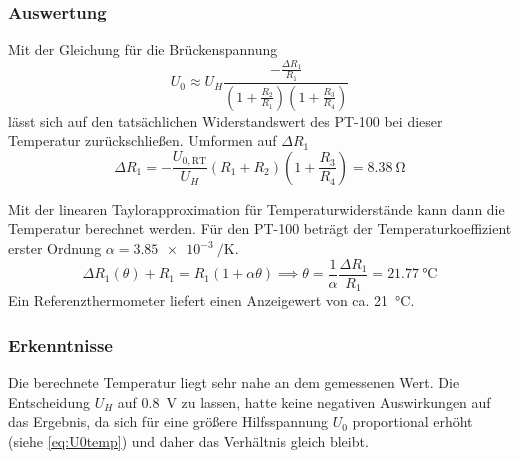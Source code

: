 \subsubsection{Auswertung}

Mit der Gleichung \cite[S.~41, Gl.~2.5]{EMTPraktikum2025} für die Brückenspannung
\begin{equation}
	U_0 \approx U_H \frac{-\frac{\Delta R_1}{R_1}}{\left(1+\frac{R_2}{R_1}\right)\left(1+\frac{R_3}{R_4}\right)}\label{eq:U0temp}
\end{equation}
lässt sich auf den tatsächlichen Widerstandswert des PT-100 bei dieser Temperatur zurückschließen. Umformen auf $\Delta R_1$
\[
	\Delta R_1 = -\frac{U_{0,\text{RT}}}{U_H}(R_1+R_2)\left(1+\frac{R_3}{R_4}\right) = \SI{8.38}{\ohm}
\]

Mit der linearen Taylorapproximation für Temperaturwiderstände
\cite[S.~17, Gl.~1.24]{EMTPraktikum2025} kann dann die Temperatur berechnet
werden. Für den PT-100 beträgt der Temperaturkoeffizient erster Ordnung
$\alpha=\SI{3.85e-3}{\per\kelvin}$.
\[
	\Delta R_1(\theta) + R_1 = R_1(1+\alpha\theta) \implies \theta = \frac{1}{\alpha}\frac{\Delta R_1}{R_1} = \SI{21.77}{\degreeCelsius}
\]
Ein Referenzthermometer liefert einen Anzeigewert von ca. \SI{21}{\degreeCelsius}.

\subsubsection{Erkenntnisse}

Die berechnete Temperatur liegt sehr nahe an dem gemessenen Wert. Die
Entscheidung $U_H$ auf \SI{0.8}{\volt} zu lassen, hatte keine negativen
Auswirkungen auf das Ergebnis, da sich für eine größere Hilfsspannung $U_0$
proportional erhöht (siehe \autoref{eq:U0temp}) und daher das Verhältnis gleich
bleibt.
